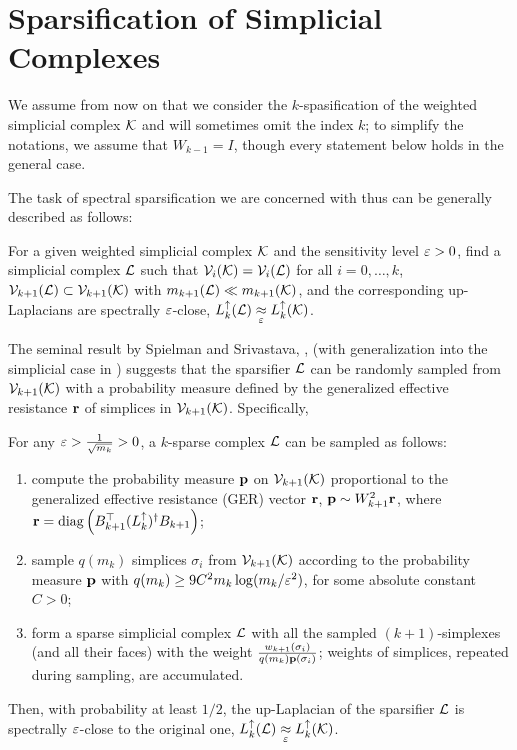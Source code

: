 \section{Sparsification of Simplicial Complexes}
\label{sec:sparse}

We assume from now on that we consider the \( k\)-spasification of the weighted simplicial complex \( \mathcal{K} \) and will sometimes omit the index \( k \); to simplify the notations, we assume that \( W_{k-1} = I \), though every statement below holds in the general case. 

The task of spectral sparsification we are concerned with thus can be generally described as follows: 
\begin{problem}
For a given weighted simplicial complex \( \mathcal{K} \) and the sensitivity level \( \varepsilon > 0 \), find a simplicial complex \( \mathcal{L} \) such that \( \mathcal{V}_{i}(\mathcal{K}) = \mathcal{V}_i(\mathcal{L})\) for all \( i = 0,\dots,k\), \( \mathcal{V}_{k+1}(\mathcal{L}) \subset \mathcal{V}_{k+1}(\mathcal{K}) \) with \( m_{k+1}(\mathcal{L}) \ll m_{k+1}(\mathcal{K}) \), and the corresponding up-Laplacians are spectrally \( \varepsilon \)-close, \( L_{k}^{\uparrow} (\mathcal{L} ) \underset{\varepsilon}{\approx} L_{k}^{\uparrow} (\mathcal{K}) \). 
\end{problem}

The seminal result by Spielman and Srivastava, \cite{spielman2008graph}, (with generalization into the simplicial case in \cite{osting2017spectral}) suggests that the sparsifier \( \mathcal{L} \) can be randomly sampled from \( \mathcal{V}_{k+1}(\mathcal{K}) \) with a probability measure defined by the generalized effective resistance \( \mathbf{r} \) of simplices in \( \mathcal{V}_{k+1}(\mathcal{K})\). Specifically, 

\begin{theorem} \label{thm:sparsify}
      For any \( \varepsilon > \frac{1}{\sqrt{m_k}} > 0 \), a \(k\)-sparse complex \( \mathcal{L} \) can be sampled as follows:
      \begin{enumerate}[leftmargin=*, label=(\arabic*)]
            \item compute the probability measure \( \mathbf{p}  \) on \( \mathcal{V}_{k+1}(\mathcal{K}) \) proportional to the generalized effective resistance (GER) vector \( \mathbf{r} \),  \( \mathbf{p} \sim W_{k+1}^2 \mathbf{r} \), where \( \mathbf{r} = \operatorname{diag} \left( B_{k+1}^\top ( L_{k}^{\uparrow} )^\dagger B_{k+1} \right) \);
            \item sample \(q(m_k)\) simplices \( \sigma_i \) from \( \mathcal{V}_{k+1}(\mathcal{K})\) according to the probability measure \( \mathbf{p}  \) with  \( q ( m_k ) \ge 9 C^2 m_{k} \log ( m_{k} / \varepsilon^2  )\), for some absolute constant  \( C>0 \);
            \item form a sparse simplicial complex \( \mathcal{L} \) with all the sampled \((k+1)\)-simplexes (and all their faces) with the weight \( \frac{ w_{k+1} (\sigma_i) }{ q(m_k) \mathbf{p}(\sigma_i)  } \); weights of simplices, repeated during sampling, are accumulated.
      \end{enumerate}
      Then, with probability at least \(1/2\), the up-Laplacian of the sparsifier \( \mathcal{L} \) is spectrally \(\varepsilon\)-close to the original one,  \( L_{k}^{\uparrow} (\mathcal{L} ) \underset{\varepsilon}{\approx} L_{k}^{\uparrow} (\mathcal{K}) \).
\end{theorem}

